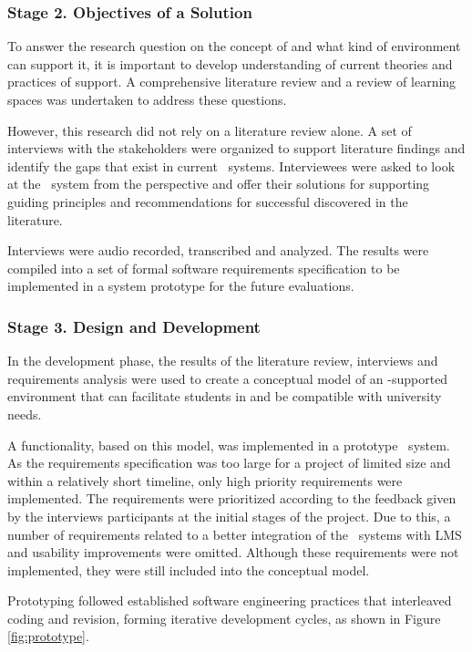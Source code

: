 \subsubsection{Stage 2. Objectives of a Solution}

To answer the research question on the concept of \LLLs and what kind of
environment can support it, it is important to develop understanding of
current theories and practices of \LLLs support. A comprehensive literature
review and a review of learning spaces was undertaken to address these
questions.

However, this research did not rely on a literature review alone. A set of
interviews with the stakeholders were organized to support literature findings
and identify the gaps that exist in current \ep~systems. Interviewees were
asked to look at the \ep~system from the \LLLs perspective and offer their
solutions for supporting guiding principles and recommendations for successful
\LLLs discovered in the literature.

Interviews were audio recorded, transcribed and analyzed. The results were
compiled into a set of formal software requirements specification to be
implemented in a system prototype for the future evaluations.

\subsubsection{Stage 3. Design and Development}

In the development phase, the results of the literature review, interviews and
requirements analysis were used to create a conceptual model of an \ep-supported
environment that can facilitate students in \LLLs and be compatible with
university needs.

A functionality, based on this model, was implemented in a prototype \ep~system.
As the requirements specification was too large for a project of limited size
and within a relatively short timeline, only high priority requirements were
implemented. The requirements were prioritized according to the feedback given
by the interviews participants at the initial stages of the project. Due to
this, a number of requirements related to a better integration of the
\ep~systems with LMS and usability improvements were omitted. Although these
requirements were not implemented, they were still included into the conceptual
model.

Prototyping followed established software engineering practices that interleaved
coding and revision, forming iterative development cycles, as shown in Figure
\ref{fig:prototype}.

